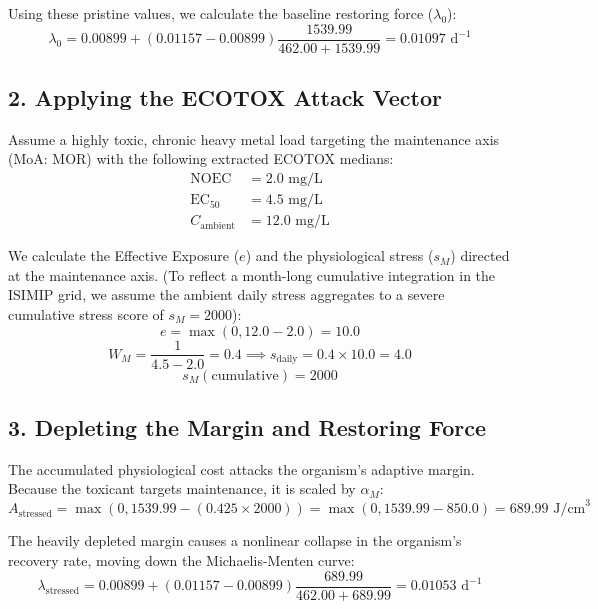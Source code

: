 \documentclass[11pt,a4paper]{article}
\begin{document}
Using these pristine values, we calculate the baseline restoring force ($\lambda_0$):
\begin{equation}
    \lambda_0 = 0.00899 + (0.01157 - 0.00899) \frac{1539.99}{462.00 + 1539.99} = 0.01097 \text{ d}^{-1}
\end{equation}

\subsection*{2. Applying the ECOTOX Attack Vector}
Assume a highly toxic, chronic heavy metal load targeting the maintenance axis (MoA: MOR) with the following extracted ECOTOX medians:
\begin{align*}
    \text{NOEC} &= 2.0 \text{ mg/L} \\
    \text{EC}_{50} &= 4.5 \text{ mg/L} \\
    C_{\mathrm{ambient}} &= 12.0 \text{ mg/L}
\end{align*}

We calculate the Effective Exposure ($e$) and the physiological stress ($s_M$) directed at the maintenance axis. (To reflect a month-long cumulative integration in the ISIMIP grid, we assume the ambient daily stress aggregates to a severe cumulative stress score of $s_M = 2000$):
\begin{equation}
    e = \max(0, 12.0 - 2.0) = 10.0
\end{equation}
\begin{equation}
    W_M = \frac{1}{4.5 - 2.0} = 0.4 \implies s_{\text{daily}} = 0.4 \times 10.0 = 4.0
\end{equation}
\begin{equation}
    s_M (\text{cumulative}) = 2000
\end{equation}

\subsection*{3. Depleting the Margin and Restoring Force}
The accumulated physiological cost attacks the organism's adaptive margin. Because the toxicant targets maintenance, it is scaled by $\alpha_M$:
\begin{equation}
    A_{\mathrm{stressed}} = \max(0, 1539.99 - (0.425 \times 2000)) = \max(0, 1539.99 - 850.0) = 689.99 \text{ J/cm}^3
\end{equation}

The heavily depleted margin causes a nonlinear collapse in the organism's recovery rate, moving down the Michaelis-Menten curve:
\begin{equation}
    \lambda_{\mathrm{stressed}} = 0.00899 + (0.01157 - 0.00899) \frac{689.99}{462.00 + 689.99} = 0.01053 \text{ d}^{-1}
\end{equation}
\end{document}
